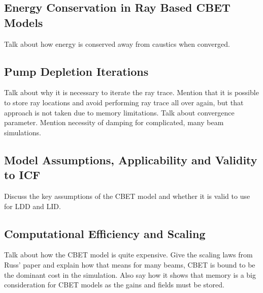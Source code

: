 \subsection{Energy Conservation in Ray Based CBET Models}

Talk about how energy is conserved away from caustics when converged.

\subsection{Pump Depletion Iterations}%
\label{sec:pump_dep_iters}

Talk about why it is necessary to iterate the ray trace.
Mention that it is possible to store ray locations and avoid performing ray trace all over again, but that approach is not taken due to memory limitations.
Talk about convergence parameter.
Mention necessity of damping for complicated, many beam simulations.

\subsection{Model Assumptions, Applicability and Validity to ICF}%
\label{sec:model_appliciability}

Discuss the key assumptions of the CBET model and whether it is valid to use for LDD and LID.

\subsection{Computational Efficiency and Scaling}

Talk about how the CBET model is quite expensive.
Give the scaling laws from Russ' paper and explain how that means for many beams, CBET is bound to be the dominant cost in the simulation.
Also say how it shows that memory is a big consideration for CBET models as the gains and fields must be stored.

